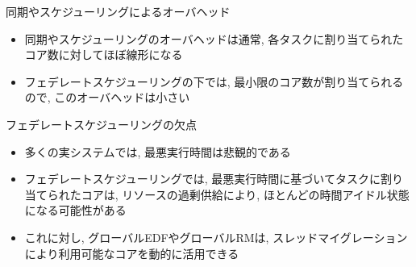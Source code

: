 \begin{frame}{同期やスケジューリングによるオーバヘッド}
    \begin{itemize}
        \item 同期やスケジューリングのオーバヘッドは通常, 各タスクに割り当てられたコア数に対してほぼ線形になる
        \item フェデレートスケジューリングの下では, 最小限のコア数が割り当てられるので, このオーバヘッドは小さい
    \end{itemize}
\end{frame}

\begin{frame}{フェデレートスケジューリングの欠点}
    \begin{itemize}
        \item 多くの実システムでは, 最悪実行時間は悲観的である
        \item フェデレートスケジューリングでは, 最悪実行時間に基づいてタスクに割り当てられたコアは, リソースの過剰供給により, ほとんどの時間アイドル状態になる可能性がある
        \item これに対し, グローバルEDFやグローバルRMは, スレッドマイグレーションにより利用可能なコアを動的に活用できる
    \end{itemize}
\end{frame}
